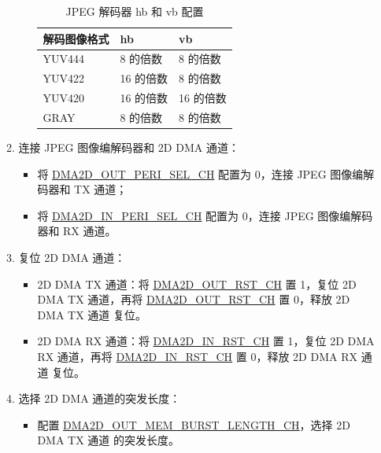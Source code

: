 \documentclass[main\_\_CN.tex]{subfiles}
\begin{document}
\begin{enumerate}
\begin{enumerate}
\begin{itemize}
        \begin{longtable}{ | L{4cm} | L{3cm} | L{3cm} | }
        \caption{JPEG 解码器 hb 和 vb 配置} \label{tab:de_hb_vb}
        \\ \hline
        \textbf{解码图像格式}  &  \textbf{hb}  &  \textbf{vb}\\ \hline
        YUV444 &  8 的倍数 &  8 的倍数  \\ \hline
        YUV422 &  16 的倍数 &  8 的倍数  \\ \hline
        YUV420 &  16 的倍数 &  16 的倍数  \\ \hline
        GRAY &  8 的倍数 &  8 的倍数  \\ \hline
        \end{longtable}
        \end{itemize}
        \item 连接 JPEG 图像编解码器和 2D DMA 通道：
        \begin{itemize}
            \item 将 \hyperref[fielddesc:DMA2DOUTPERISELCHN]{DMA2D\_OUT\_PERI\_SEL\_CH} 配置为 0，连接 JPEG 图像编解码器和 TX 通道；
            \item 将 \hyperref[fielddesc:DMA2DINPERISELCHN]{DMA2D\_IN\_PERI\_SEL\_CH} 配置为 0，连接 JPEG 图像编解码器和 RX 通道。
        \end{itemize}
        \item 复位 2D DMA 通道：
        \begin{itemize}
            \item 2D DMA TX 通道：将 \hyperref[fielddesc:DMA2DOUTRSTCHN]{DMA2D\_OUT\_RST\_CH} 置 1，复位 2D DMA TX 通道，再将 \hyperref[fielddesc:DMA2DOUTRSTCHN]{DMA2D\_OUT\_RST\_CH} 置 0，释放 2D DMA TX 通道 复位。
            \item 2D DMA RX 通道：将 \hyperref[fielddesc:DMA2DINRSTCHN]{DMA2D\_IN\_RST\_CH} 置 1，复位 2D DMA RX 通道，再将 \hyperref[fielddesc:DMA2DINRSTCHN]{DMA2D\_IN\_RST\_CH} 置 0，释放 2D DMA RX 通道 复位。
        \end{itemize}
        \item 选择 2D DMA 通道的突发长度：
        \begin{itemize}
            \item 配置 \hyperref[fielddesc:DMA2DOUTMEMBURSTLENGTHCHN]{DMA2D\_OUT\_MEM\_BURST\_LENGTH\_CH}，选择 2D DMA TX 通道 的突发长度。

\end{itemize}
\end{enumerate}
\end{enumerate}
\end{document}
